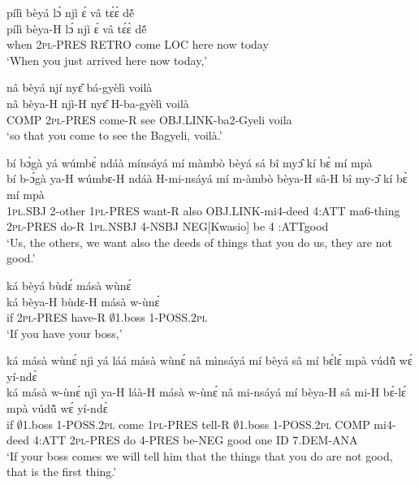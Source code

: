 \begin{exe} 
\exC\label{97}
  \glll pílì bèyá lɔ́ njì ɛ́ vâ tɛ́ɛ̀ dẽ́  \\ 
       pílì bèya-H lɔ́ njì ɛ́ vâ tɛ́ɛ̀ dẽ́ \\
         when 2\textsc{pl}-PRES RETRO come LOC here now today  \\
    \trans `When you just arrived here now today,'
\end{exe}

\begin{exe} 
\exC\label{98} 
  \glll  nâ bèyá njí nyɛ̂ bá-gyèlì voilà \\
      nâ bèya-H njì-H nyɛ̂ H-ba-gyèlì voilà \\
          COMP 2\textsc{pl}-PRES come-R see OBJ.LINK-ba2-Gyeli voila  \\
    \trans `so that you come to see the Bagyeli, voilà.'
\end{exe}

\begin{exe} 
\exC\label{99}
  \glll  bí bɔ́gà yá wúmbɛ́ ndáà mínsáyá mí màmbò bèyá sá bî myɔ̂ kí bɛ̀ mí mpà \\
         bí b-ɔ́gà ya-H wúmbɛ-H ndáà H-mi-nsáyá mí m-àmbò bèya-H sâ-H bî my-ɔ̂ kí bɛ̀ mí mpà \\
          1\textsc{pl}.SBJ 2-other 1\textsc{pl}-PRES want-R also OBJ.LINK-mi4-deed 4:ATT ma6-thing 2\textsc{pl}-PRES do-R 1\textsc{pl}.NSBJ 4-NSBJ NEG[Kwasio] be 4 :ATTgood \\
    \trans `Us, the others, we want also the deeds of things that you do us, they are not good.'
\end{exe}

\begin{exe} 
\exC\label{100} 
  \glll ká bèyá bùdɛ́ másà wùnɛ́ \\ 
        ká bèya-H bùdɛ-H másà w-ùnɛ́ \\
         if 2\textsc{pl}-PRES have-R $\emptyset$1.boss 1-POSS.2\textsc{pl}   \\
    \trans `If you have your boss,'
\end{exe}

\begin{exe} 
\exC\label{101}
  \glll  ká másà wùnɛ́ njì yá láá másà wùnɛ́ nâ mìnsáyá mí bèyá sâ mí bɛ́lɛ́ mpà vúdũ̂ wɛ́ yí-ndɛ̀ \\
         ká másà w-ùnɛ́ njì ya-H láà-H másà w-ùnɛ́ nâ mi-nsáyá mí bèya-H sâ mi-H bɛ́-lɛ́ mpà vúdũ̂ wɛ́ yí-ndɛ̀\\
         if $\emptyset$1.boss 1-POSS.2\textsc{pl} come 1\textsc{pl}-PRES tell-R $\emptyset$1.boss 1-POSS.2\textsc{pl} COMP mi4-deed 4:ATT 2\textsc{pl}-PRES do 4-PRES be-NEG good one ID 7.DEM-ANA \\
    \trans `If your boss comes we will tell him that the things that you do are not good, that is the first thing.'
\end{exe}

